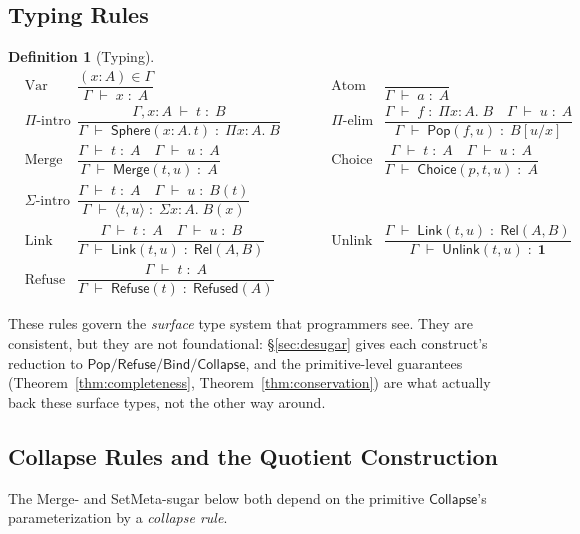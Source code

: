 \documentclass[12pt]{article}
\newcommand{\Entails}{\;\vdash\;}
\newcommand{\Types}{\;:\;}
\newcommand{\Subst}[2]{[#1/#2]}
\newcommand{\Sphere}{\mathsf{Sphere}}
\newcommand{\Pop}{\mathsf{Pop}}
\newcommand{\Merge}{\mathsf{Merge}}
\newcommand{\Choice}{\mathsf{Choice}}
\newcommand{\Ctx}{\Gamma}
\newcommand{\PiT}[3]{\Pi #1 : #2.\; #3}
\newcommand{\SigT}[3]{\Sigma #1 : #2.\; #3}
\newcommand{\Rel}[2]{\mathsf{Rel}(#1,#2)}
\newcommand{\Refused}[1]{\mathsf{Refused}(#1)}
\newcommand{\Unit}{\mathbf{1}}
\newcommand{\Pair}[2]{\langle #1, #2 \rangle}
\newcommand{\Judgement}[3]{#1 \Entails #2 \Types #3}
\theoremstyle{definition}
\newtheorem{definition}{Definition}
\newcommand{\LinkOp}{\mathsf{Link}}
\newcommand{\UnlinkOp}{\mathsf{Unlink}}
\newcommand{\RefuseOp}{\mathsf{Refuse}}
\newcommand{\CollapseOp}{\mathsf{Collapse}}
\newcommand{\BindOp}{\mathsf{Bind}}
\begin{document}
\subsection{Typing Rules}
\begin{definition}[Typing]
\begin{align*}
&\text{Var} & \dfrac{(x\!:\!A)\in \Ctx}{\Judgement{\Ctx}{x}{A}} \qquad
&&\text{Atom} & \dfrac{}{\Judgement{\Ctx}{a}{A}}\\[1ex]
&\Pi\text{-intro} & \dfrac{\Judgement{\Ctx,x\!:\!A}{t}{B}}{\Judgement{\Ctx}{\Sphere(x\!:\!A.\,t)}{\PiT{x}{A}{B}}} \qquad
&&\Pi\text{-elim} & \dfrac{\Judgement{\Ctx}{f}{\PiT{x}{A}{B}} \quad \Judgement{\Ctx}{u}{A}}{\Judgement{\Ctx}{\Pop(f,u)}{B\Subst{u}{x}}}\\[1ex]
&\text{Merge} & \dfrac{\Judgement{\Ctx}{t}{A}\quad \Judgement{\Ctx}{u}{A}}{\Judgement{\Ctx}{\Merge(t,u)}{A}} \qquad
&&\text{Choice} & \dfrac{\Judgement{\Ctx}{t}{A}\quad \Judgement{\Ctx}{u}{A}}{\Judgement{\Ctx}{\Choice(p,t,u)}{A}}\\[1ex]
&\Sigma\text{-intro} & \dfrac{\Judgement{\Ctx}{t}{A}\quad \Judgement{\Ctx}{u}{B(t)}}{\Judgement{\Ctx}{\Pair{t}{u}}{\SigT{x}{A}{B(x)}}}\\[1ex]
&\text{Link} & \dfrac{\Judgement{\Ctx}{t}{A}\quad \Judgement{\Ctx}{u}{B}}{\Judgement{\Ctx}{\LinkOp(t,u)}{\Rel{A}{B}}} \qquad
&&\text{Unlink} & \dfrac{\Judgement{\Ctx}{\LinkOp(t,u)}{\Rel{A}{B}}}{\Judgement{\Ctx}{\UnlinkOp(t,u)}{\Unit}}\\[1ex]
&\text{Refuse} & \dfrac{\Judgement{\Ctx}{t}{A}}{\Judgement{\Ctx}{\RefuseOp(t)}{\Refused{A}}}
\end{align*}
\end{definition}

These rules govern the \emph{surface} type system that programmers see. They are consistent, but they are not foundational: \S\ref{sec:desugar} gives each construct's reduction to $\Pop/\RefuseOp/\BindOp/\CollapseOp$, and the primitive-level guarantees (Theorem~\ref{thm:completeness}, Theorem~\ref{thm:conservation}) are what actually back these surface types, not the other way around.

\subsection{Collapse Rules and the Quotient Construction}
\label{sec:collapse-quotient}

The Merge- and SetMeta-sugar below both depend on the primitive $\CollapseOp$'s parameterization by a \emph{collapse rule}.
\end{document}
